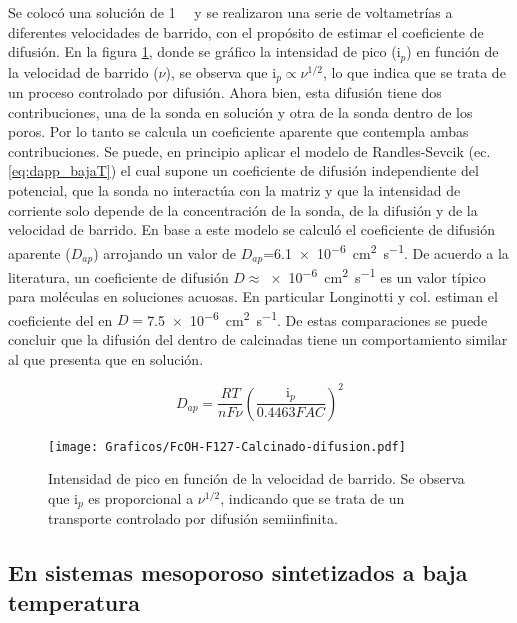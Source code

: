 	 Se colocó una solución de \fc\space \SI{1}{\milli\Molar} y se realizaron una serie de voltametrías a diferentes velocidades de barrido, con el propósito de estimar el coeficiente de difusión. En la figura \ref{fig:difusion_calcinado}, donde se gráfico la intensidad de pico (i$_p$) en función de la velocidad de barrido ($\nu$), se observa que $\text{i}_p \propto \nu^{1/2}$, lo que indica que se trata de un proceso controlado por difusión. Ahora bien, esta difusión tiene dos contribuciones, una de la sonda en solución y otra de la sonda dentro de los poros. Por lo tanto se calcula un coeficiente aparente que contempla ambas contribuciones. Se puede, en principio aplicar el modelo de Randles-Sevcik (ec. \ref{eq:dapp_bajaT}) el cual supone un coeficiente de difusión independiente del potencial, que la sonda no interactúa con la matriz y que la intensidad de corriente solo depende de la concentración de la sonda, de la difusión y de la velocidad de barrido. En base a este modelo se calculó el coeficiente de difusión aparente ($D_{ap}$) arrojando un valor de $D_{ap}$=\SI{6,1e-6}{\square\cm\per\second}. De acuerdo a la literatura, un coeficiente de difusión $D\approx$\SI{e-6}{\square\cm\per\second} es un valor típico para moléculas en soluciones acuosas. \cite{koryta1993,Otal2006} En particular Longinotti y col.\cite{longinotti2007} estiman el coeficiente del \fc\space en $D=$\SI{7,5e-6}{\square\cm\per\second}. De estas comparaciones se puede concluir que la difusión del \fc\space dentro de \pdmF\space calcinadas tiene un comportamiento similar al que presenta que en solución.


		 \begin{equation}
					D_{ap}=\frac{RT}{nF\nu}\left(\frac{\text{i}_p}{0.4463FAC}\right)^2
					\label{eq:dapp_bajaT}
			\end{equation}  
	 

		    \begin{figure}[ht]
				\centering
		 	    \texttt{[image: Graficos/FcOH-F127-Calcinado-difusion.pdf]}
		        \caption[i$_p$ en función de $\nu$ para \fc\space]{Intensidad de pico en función de la velocidad de barrido. Se observa que $\text{i}_p$ es proporcional a $\nu ^{1/2}$, indicando que se trata de un transporte controlado por difusión semiinfinita.}
		        \label{fig:difusion_calcinado}
		      	\end{figure}
	      	
	\subsection{En sistemas mesoporoso sintetizados a baja temperatura}

